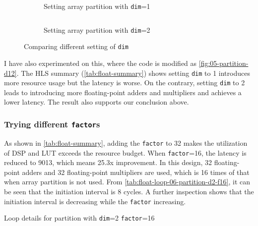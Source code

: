 \begin{figure}[ht!]
    \begin{subfigure}[b]{\textwidth}
        \inputminted[firstline=3]{diff}{program/05-partition-d1-f2.diff}
        \caption{Setting array partition with \texttt{dim}=1}
        \label{fig:05-partition-d1-f2.diff}
    \end{subfigure}
    \begin{subfigure}[b]{\textwidth}
        \inputminted[firstline=3]{diff}{program/05-partition-d2-f2.diff}
        \caption{Setting array partition with \texttt{dim}=2}
        \label{fig:05-partition-d2-f2.diff}
    \end{subfigure}
    \caption{Comparing different setting of \texttt{dim}}\label{fig:05-partition-d12}
\end{figure}

I have also experimented on this, where the code is modified as \autoref{fig:05-partition-d12}.
The HLS summary (\autoref{tab:float-summary}) shows setting \texttt{dim} to 1 introduces more resource usage but the latency is worse.
On the contrary, setting \texttt{dim} to 2 leads to introducing more floating-point adders and multipliers and achieves a lower latency.
The result also supports our conclusion above.

\subsubsection{Trying different \texttt{factor}s}\label{sec:1cFac}

As shown in \autoref{tab:float-summary}, adding the \texttt{factor} to 32 makes the utilization of DSP and LUT exceeds the resource budget.
When \texttt{factor}=16, the latency is reduced to 9013, which means 25.3x improvement.
In this design, 32 floating-point adders and 32 floating-point multipliers are used, which is 16 times of that when array partition is not used.
From \autoref{tab:float-loop-06-partition-d2-f16}, it can be seen that the initiation interval is 8 cycles.
A further inspection shows that the initiation interval is decreasing while the \texttt{factor} increasing.

\begin{table}[ht!]
    \caption{Loop details for partition with \texttt{dim}=2 \texttt{factor}=16}
    \label{tab:float-loop-06-partition-d2-f16}
    \centering
    
\end{table}
